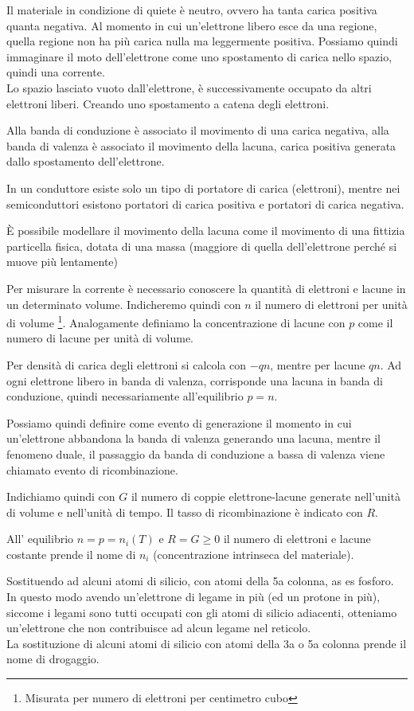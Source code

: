 \documentclass[../template]{subfiles}
\begin{document}
Il materiale in condizione di quiete è neutro, ovvero ha tanta carica positiva quanta negativa. Al momento in cui un'elettrone libero esce da una regione, quella regione non ha più carica nulla ma leggermente positiva. Possiamo quindi immaginare il moto dell'elettrone come uno spostamento di carica nello spazio, quindi una corrente.
\\
Lo spazio lasciato vuoto dall'elettrone, è successivamente occupato da altri elettroni liberi. Creando uno spostamento a catena degli elettroni.

Alla banda di conduzione è associato il movimento di una carica negativa, alla banda di valenza è associato il movimento della lacuna, carica positiva generata dallo spostamento dell'elettrone.

In un conduttore esiste solo un tipo di portatore di carica (elettroni), mentre nei semiconduttori esistono portatori di carica positiva e portatori di carica negativa.

È possibile modellare il movimento della lacuna come il movimento di una fittizia particella fisica, dotata di una massa (maggiore di quella dell'elettrone perché si muove più lentamente)

Per misurare la corrente è necessario conoscere la quantità di elettroni e lacune in un determinato volume.
Indicheremo quindi con $n$ il numero di elettroni per unità di volume \footnote{Misurata per numero di elettroni per centimetro cubo}.
Analogamente definiamo la concentrazione di lacune con $p$ come il numero di lacune per unità di volume.

Per densità di carica degli elettroni si calcola con $-qn$, mentre per lacune $qn$.
Ad ogni elettrone libero in banda di valenza, corrisponde una lacuna in banda di conduzione, quindi necessariamente all'equilibrio $p = n$.

Possiamo quindi definire come evento di generazione il momento in cui un'elettrone abbandona la banda di valenza generando una lacuna, mentre il fenomeno duale, il passaggio da banda di conduzione a bassa di valenza viene chiamato evento di ricombinazione.

Indichiamo quindi con $G$ il numero di coppie elettrone-lacune generate nell'unità di volume e nell'unità di tempo. Il tasso di ricombinazione è indicato con $R$.

All' equilibrio $n = p = n_i(T)$ e $R = G\ge 0$ il numero di elettroni e lacune costante prende il nome di $n_i$ (concentrazione intrinseca del materiale).

Sostituendo ad alcuni atomi di silicio, con atomi della 5a colonna, as es fosforo. In questo modo avendo un'elettrone di legame in più (ed un protone in più), siccome i legami sono tutti occupati con gli atomi di silicio adiacenti, otteniamo un'elettrone che non contribuisce ad alcun legame nel reticolo.
\\
La sostituzione di alcuni atomi di silicio con atomi della 3a o 5a colonna prende il nome di drogaggio.
\end{document}
